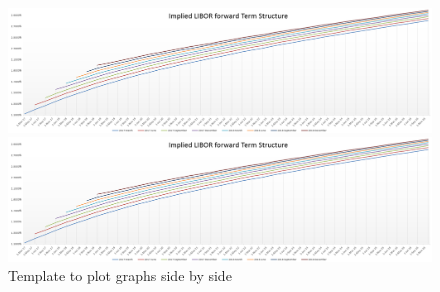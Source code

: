 \begin{figure}[h]
  \centering
  \begin{minipage}[h]{0.85\textwidth}
    \includegraphics[width=\textwidth]{biu.PNG}
  \end{minipage}
  \hfill
  \begin{minipage}[h]{0.1\textwidth}
    \includegraphics[width=\textwidth]{biu.PNG}
  \end{minipage}
  \caption{Template to plot graphs side by side}
\end{figure}
